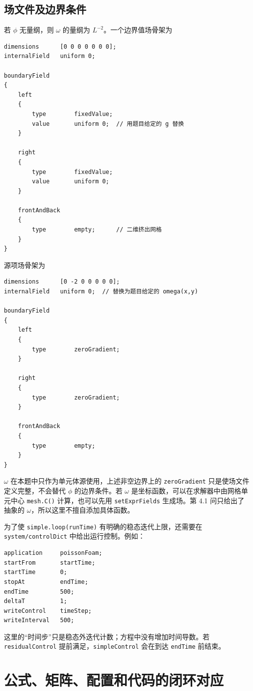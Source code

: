 \documentclass[UTF8,a4paper,11pt]{ctexart}
\begin{document}
\subsection{场文件及边界条件}

若 \(\phi\) 无量纲，则 \(\omega\) 的量纲为 \(L^{-2}\)。一个边界值场骨架为
\begin{lstlisting}[language=OpenFOAM,caption={0/phi 的边界骨架}]
dimensions      [0 0 0 0 0 0 0];
internalField   uniform 0;

boundaryField
{
    left
    {
        type        fixedValue;
        value       uniform 0;  // 用题目给定的 g 替换
    }

    right
    {
        type        fixedValue;
        value       uniform 0;
    }

    frontAndBack
    {
        type        empty;      // 二维挤出网格
    }
}
\end{lstlisting}
源项场骨架为
\begin{lstlisting}[language=OpenFOAM,caption={0/omega 的量纲与内部场}]
dimensions      [0 -2 0 0 0 0 0];
internalField   uniform 0;  // 替换为题目给定的 omega(x,y)

boundaryField
{
    left
    {
        type        zeroGradient;
    }

    right
    {
        type        zeroGradient;
    }

    frontAndBack
    {
        type        empty;
    }
}
\end{lstlisting}
\(\omega\) 在本题中只作为单元体源使用，上述非空边界上的 \texttt{zeroGradient} 只是使场文件定义完整，不会替代 \(\phi\) 的边界条件。若 \(\omega\) 是坐标函数，可以在求解器中由网格单元中心 \texttt{mesh.C()} 计算，也可以先用 \texttt{setExprFields} 生成场。第 4.1 问只给出了抽象的 \(\omega\)，所以这里不擅自添加具体函数。

为了使 \texttt{simple.loop(runTime)} 有明确的稳态迭代上限，还需要在 \texttt{system/controlDict} 中给出运行控制。例如：
\begin{lstlisting}[language=OpenFOAM,caption={controlDict 的核心运行控制}]
application     poissonFoam;
startFrom       startTime;
startTime       0;
stopAt          endTime;
endTime         500;
deltaT          1;
writeControl    timeStep;
writeInterval   500;
\end{lstlisting}
这里的“时间步”只是稳态外迭代计数；方程中没有增加时间导数。若 \texttt{residualControl} 提前满足，\texttt{simpleControl} 会在到达 \texttt{endTime} 前结束。

\section{公式、矩阵、配置和代码的闭环对应}
\end{document}
